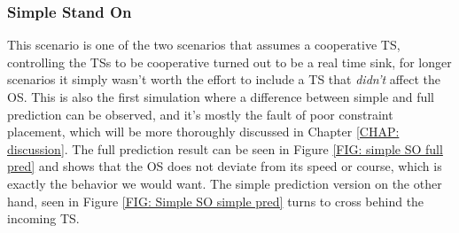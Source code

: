 \subsubsection{Simple Stand On}
This scenario is one of the two scenarios that assumes a cooperative TS, controlling the TSs to be cooperative turned out to be a real time sink, for longer scenarios
it simply wasn't worth the effort to include a TS that \textit{didn't} affect the OS.
This is also the first simulation where a difference between simple and full
prediction can be observed, and it's mostly the fault of poor constraint placement, which will be more thoroughly 
discussed in Chapter \ref{CHAP: discussion}. The full prediction result can be seen in
Figure \ref{FIG: simple SO full pred} and shows that the OS does not deviate from its speed or course, which is exactly the behavior we would want. 
The simple prediction version on the other hand, seen in Figure \ref{FIG: Simple SO simple pred} turns to cross behind the incoming TS.

